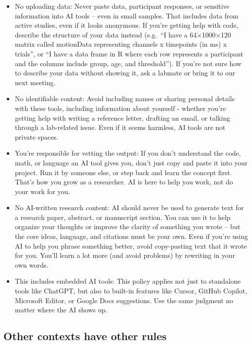 \documentclass[
]{book}
\providecommand{\tightlist}{%
  \setlength{\itemsep}{0pt}\setlength{\parskip}{0pt}}
\begin{document}
\begin{itemize}
\tightlist
\item
  No uploading data: Never paste data, participant responses, or sensitive information into AI tools -- even in small samples. That includes data from active studies, even if it looks anonymous. If you're getting help with code, describe the structure of your data instead (e.g.~``I have a 64×1000×120 matrix called motionData representing channels x timepoints (in ms) x trials'', or ``I have a data frame in R where each row represents a participant and the columns include group, age, and threshold''). If you're not sure how to describe your data without showing it, ask a labmate or bring it to our next meeting.
\item
  No identifiable content: Avoid including names or sharing personal details with these tools, including information about yourself - whether you're getting help with writing a reference letter, drafting an email, or talking through a lab-related issue. Even if it seems harmless, AI tools are not private spaces.
\item
  You're responsible for vetting the output: If you don't understand the code, math, or language an AI tool gives you, don't just copy and paste it into your project. Run it by someone else, or step back and learn the concept first. That's how you grow as a researcher. AI is here to help you work, not do your work for you.
\item
  No AI-written research content: AI should never be used to generate text for a research paper, abstract, or manuscript section. You can use it to help organize your thoughts or improve the clarity of something you wrote -- but the core ideas, language, and citations must be your own. Even if you're using AI to help you phrase something better, avoid copy-pasting text that it wrote for you. You'll learn a lot more (and avoid problems) by rewriting in your own words.
\item
  This includes embedded AI tools: This policy applies not just to standalone tools like ChatGPT, but also to built-in features like Cursor, GitHub Copilot, Microsoft Editor, or Google Docs suggestions. Use the same judgment no matter where the AI shows up.
\end{itemize}

\subsection{Other contexts have other rules}\label{other-contexts-have-other-rules}
\end{document}
